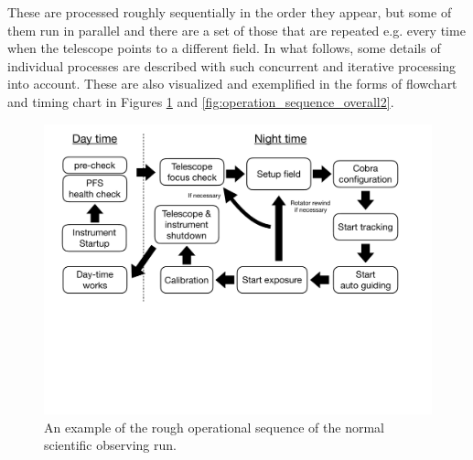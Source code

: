 \documentclass[a4paper]{article}
\begin{document}
These are processed roughly sequentially in the order they appear, but
some of them run in parallel and there are a set of those that are
repeated e.g. every time when the telescope points to a different
field. In what follows, some details of individual processes are
described with such concurrent and iterative processing into
account. These are also visualized and exemplified in the forms of
flowchart and timing chart in Figures
\ref{fig:operation_sequence_overall1} and \ref{fig:operation_sequence_overall2}.

\begin{figure}[!htb]
\begin{center}
\includegraphics[scale=0.4]{./figures/PFS_night_operation_sequence_overall_cut.pdf}
\end{center}
\caption{An example of the rough operational sequence of the normal scientific observing run. \label{fig:operation_sequence_overall1}}
\end{figure}
\end{document}

